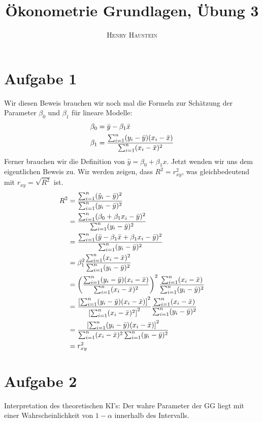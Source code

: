 \documentclass{article}
\title{\textbf{Ökonometrie Grundlagen, Übung 3}}
\author{\textsc{Henry Haustein}}
\date{}
\begin{document}
	\maketitle
	
	\section*{Aufgabe 1}
	Wir diesen Beweis brauchen wir noch mal die Formeln zur Schätzung der Parameter $\beta_0$ und $\beta_1$ für lineare Modelle:
	\begin{align}
		\beta_0 &= \bar{y} - \beta_1\bar{x} \notag \\
		\beta_1 &= \frac{\sum_{i=1}^{n}(y_i-\bar{y})(x_i-\bar{x})}{\sum_{i=1}^n (x_i-\bar{x})^2} \notag
	\end{align}
	Ferner brauchen wir die Definition von $\hat{y}=\beta_0+\beta_1x$. Jetzt wenden wir uns dem eigentlichen Beweis zu. Wir werden zeigen, dass $R^2=r^2_{xy}$, was gleichbedeutend mit $r_{xy}=\sqrt{R^2}$ ist.
	\begin{align}
		R^2 &= \frac{\sum_{i=1}^n (\hat{y}_i-\bar{y})^2}{\sum_{i=1}^n (y_i-\bar{y})^2} \notag \\
		&= \frac{\sum_{i=1}^n (\beta_0+\beta_1x_i - \bar{y})^2}{\sum_{i=1}^n (y_i-\bar{y})^2} \notag \\
		&= \frac{\sum_{i=1}^n (\bar{y}-\beta_1\bar{x}+\beta_1x_i-\bar{y})^2}{\sum_{i=1}^n (y_i-\bar{y})^2} \notag \\
		&= \beta_1^2\frac{\sum_{i=1}^n (x_i-\bar{x})^2}{\sum_{i=1}^n (y_i-\bar{y})^2} \notag \\
		&=\left(\frac{\sum_{i=1}^n (y_i-\bar{y})(x_i-\bar{x})}{\sum_{i=1}^n (x_i-\bar{x})^2}\right)^2\frac{\sum_{i=1}^n (x_i-\bar{x})}{\sum_{i=1}^n (y_i-\bar{y})^2} \notag \\
		&= \frac{\left[\sum_{i=1}^n (y_i-\bar{y})(x_i-\bar{x})\right]^2}{\left[\sum_{i=1}^n (x_i-\bar{x})^2\right]^2}\frac{\sum_{i=1}^n (x_i-\bar{x})}{\sum_{i=1}^n (y_i-\bar{y})^2} \notag \\
		&= \frac{\left[\sum_{i=1}^n (y_i-\bar{y})(x_i-\bar{x})\right]^2}{\sum_{i=1}^n (x_i-\bar{x})^2\sum_{i=1}^n (y_i-\bar{y})^2} \notag \\
		&= r_{xy}^2 \notag
	\end{align}
	
	\section*{Aufgabe 2}
	Interpretation des theoretischen KI's: Der wahre Parameter der GG liegt mit einer Wahrscheinlichkeit von $1-\alpha$ innerhalb des Intervalls.
	
\end{document}
